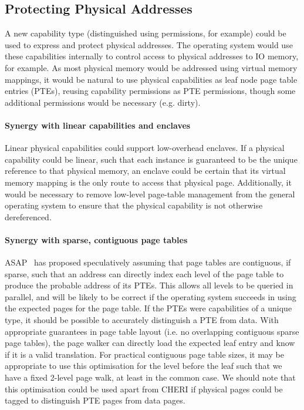 \subsection{Protecting Physical Addresses}

A new capability type (distinguished using permissions, for example) could be
used to express and protect physical addresses.
The operating system would use these capabilities internally to control access
to physical addresses to IO memory, for example.
As most physical memory would be addressed using virtual memory mappings,
it would be natural to use physical capabilities as leaf node page table
entries (PTEs), reusing capability permissions as PTE permissions, though some
additional permissions would be necessary (e.g. dirty).

\paragraph{Synergy with linear capabilities and enclaves}
Linear physical capabilities could support low-overhead enclaves. 
If a physical capability could be linear, such that each instance is guaranteed
to be the unique reference to that physical memory, an enclave could be certain
that its virtual memory mapping is the only route to access that
physical page.
Additionally, it would be necessary to remove low-level page-table management
from the general operating system to ensure that the physical capability is not otherwise
dereferenced.

\paragraph{Synergy with sparse, contiguous page tables}
ASAP~\cite{margaritov2019prefetched} has proposed speculatively assuming that page
tables are contiguous, if sparse,
such that an address can directly index each level of
the page table to produce the probable address of its PTEs.  This allows all levels
to be queried in parallel, and will be likely to be correct if the operating system
succeeds in using the expected pages for the page table.
If the PTEs were capabilities of a unique type, it should be possible to
accurately distinguish a PTE from data.
With appropriate guarantees in page table layout (i.e. no overlapping contiguous
sparse page tables), the page walker can directly load the expected leaf entry
and know if it is a valid translation.
For practical contiguous page table sizes, it may be appropriate to use this
optimisation for the level before the leaf such that we have a fixed 2-level
page walk, at least in the common case.
We should note that this optimisation could be used apart from CHERI if physical
pages could be tagged to distinguish PTE pages from data pages.


